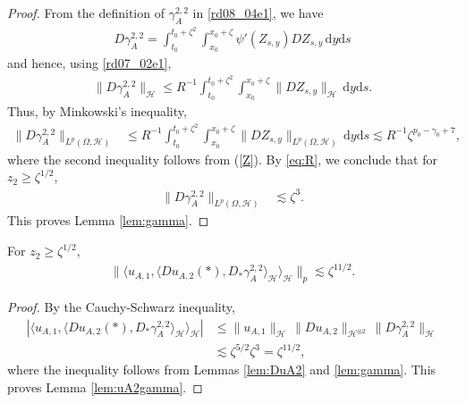 \documentclass[12pt,a4paper]{article}
\newcommand{\HH}{\mathcal{H}}
\renewcommand{\d}{\mathrm{d}}
\newcommand {\deltah}{{\zeta}}
\newcommand{\<}{\langle}
\renewcommand{\>}{\rangle}
\begin{document}
\begin{proof}
           From the definition of $\gamma_A^{2,2}$ in \eqref{rd08_04e1}, we have 
           \begin{align*}
           D\gamma_A^{2,2}=\int_{t_0}^{t_0+\deltah^2}\int_{x_0}^{x_0+\deltah}\psi'(Z_{s,y}) DZ_{s,y}\, \d y\d s
           \end{align*}
           and hence, using \eqref{rd07_02e1},
                      \begin{align*}
           \|D\gamma_A^{2,2}\|_{\mathcal{H}}\leq R^{-1}\int_{t_0}^{t_0+\deltah^2}\int_{x_0}^{x_0+\deltah}\|DZ_{s,y}\|_{\mathcal{H}}\, \d y\d s.
           \end{align*}
           Thus, by Minkowski's inequality, 
\begin{align*}
           \|D\gamma_A^{2,2}\|_{L^p(\Omega, \mathcal{H})}&\leq R^{-1}\int_{t_0}^{t_0+\deltah^2}\int_{x_0}^{x_0+\deltah}\|DZ_{s,y}\|_{L^p(\Omega, \mathcal{H})}\, \d y\d s
           \lesssim  R^{-1}\deltah^{p_0-\gamma_0+7},
 \end{align*}
           where the second inequality follows from (\ref{Z}).  %
 By \eqref{eq:R}, we conclude  that for $z_2\geq \deltah^{1/2}$,
\begin{align*}
           \|D\gamma_A^{2,2}\|_{L^p(\Omega, \mathcal{H})}           &\lesssim  \deltah^{3}.
\end{align*}
           This proves Lemma \ref{lem:gamma}.
\end{proof}


\begin{lemma}\label{lem:uA2gamma}
           For $z_2\geq \deltah^{1/2}$, 
           \begin{align*}\label{eq:uA2gamma}
           \|\langle u_{A,1}, \langle Du_{A,2}(*), D_*\gamma_A^{2,2}\rangle_\HH\rangle_\HH \|_p\lesssim \deltah^{11/2}.
           \end{align*}
\end{lemma}

\begin{proof}
          By the Cauchy-Schwarz inequality, 
 \begin{align*}
          | \langle u_{A,1}, \langle Du_{A,2}(*), D_*\gamma_A^{2,2}\rangle_\HH\rangle_\HH | &\leq \|u_{A,1}\|_\HH \, \|Du_{A,2}\|_{\HH^{\otimes2}}\, 
          \|D\gamma_A^{2,2}\|_\HH \\
          &\lesssim \deltah^{5/2} \deltah ^3 = \deltah^{11/2},
\end{align*}
where the inequality follows from Lemmas \ref{lem:DuA2} and \ref{lem:gamma}. This proves Lemma \ref{lem:uA2gamma}.
\end{proof}
\end{document}
